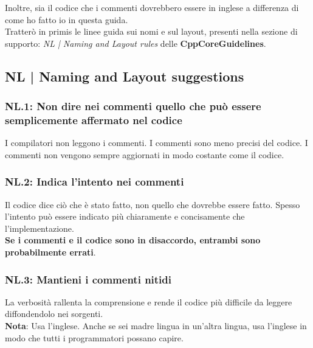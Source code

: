 \textsf{\small Inoltre, sia il codice che i commenti dovrebbero essere in inglese a differenza di come ho fatto io in questa guida.} \\

\textsf{\small Tratterò in primis le linee guida sui nomi e sul layout, presenti nella sezione di supporto: \emph{NL | Naming and Layout rules} delle \textbf{CppCoreGuidelines}.} \break


\subsection{NL | Naming and Layout suggestions}

\subsubsection{NL.1: Non dire nei commenti quello che può essere semplicemente affermato nel codice}

\textsf{\small I compilatori non leggono i commenti. I commenti sono meno precisi del codice. I commenti non vengono sempre aggiornati in modo costante come il codice.} \\

\subsubsection{NL.2: Indica l'intento nei commenti}

\textsf{\small Il codice dice ciò che è stato fatto, non quello che dovrebbe essere fatto. Spesso l'intento può essere indicato più chiaramente e concisamente che l'implementazione. } \\

\textsf{\small \textbf{Se i commenti e il codice sono in disaccordo, entrambi sono probabilmente errati}.} \\

\subsubsection{NL.3: Mantieni i commenti nitidi}

\textsf{\small La verbosità rallenta la comprensione e rende il codice più difficile da leggere diffondendolo nei sorgenti.} \\

\textsf{\small \textbf{Nota}: Usa l'inglese. Anche se sei madre lingua in un'altra lingua, usa l'inglese in modo che tutti i programmatori possano capire.} \\

